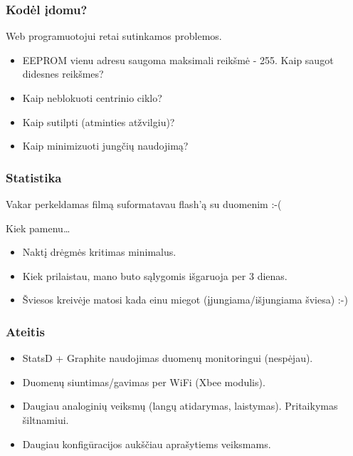 \documentclass[12pt,a4paper]{beamer}
\begin{document}
\begin{frame}
    \frametitle{Kodėl įdomu?}
    Web programuotojui retai sutinkamos problemos.
    \vskip1cm
    \begin{itemize}
        \item EEPROM vienu adresu saugoma maksimali reikšmė - 255. Kaip saugot didesnes reikšmes?
        \item Kaip neblokuoti centrinio ciklo? 
        \item Kaip sutilpti (atminties atžvilgiu)?
        \item Kaip minimizuoti jungčių naudojimą?
    \end{itemize}
    
\end{frame}

\begin{frame}
    \frametitle{Statistika}

    \begin{center}
        Vakar perkeldamas filmą suformatavau flash'ą su duomenim :-(
    \end{center}

    \pause
    Kiek pamenu\ldots
    \begin{itemize}
        \item Naktį drėgmės kritimas minimalus.
        \item Kiek prilaistau, mano buto sąlygomis išgaruoja per 3 dienas.
        \item Šviesos kreivėje matosi kada einu miegot (įjungiama/išjungiama šviesa) :-)
    \end{itemize}

\end{frame}

\begin{frame}
    \frametitle{Ateitis}

    \begin{itemize}
        \item StatsD + Graphite naudojimas duomenų monitoringui (nespėjau).
        \item Duomenų siuntimas/gavimas per WiFi (Xbee modulis).
        \item Daugiau analoginių veiksmų (langų atidarymas, laistymas). Pritaikymas šiltnamiui.
        \item Daugiau konfigūracijos aukščiau aprašytiems veiksmams.
    \end{itemize}
    
\end{frame}
\end{document}
